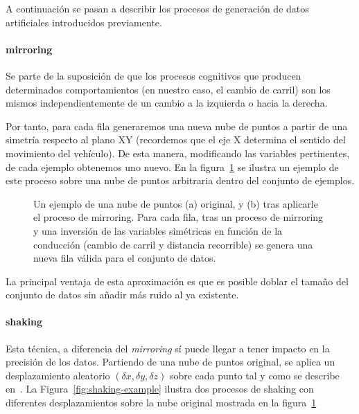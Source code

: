 A continuación se pasan a describir los procesos de generación de datos artificiales introducidos previamente.

\paragraph{mirroring}

Se parte de la suposición de que los procesos cognitivos que producen determinados comportamientos (en nuestro caso, el cambio de carril) son los mismos independientemente de un cambio a la izquierda o hacia la derecha.

Por tanto, para cada fila generaremos una nueva nube de puntos a partir de una simetría respecto al plano XY (recordemos que el eje X determina el sentido del movimiento del vehículo). De esta manera, modificando las variables pertinentes, de cada ejemplo obtenemos uno nuevo. En la figura~\ref{fig:mirroring-example} se ilustra un ejemplo de este proceso sobre una nube de puntos arbitraria dentro del conjunto de ejemplos.

\begin{figure}
	\centering
	\qquad
	\caption[Ejemplo de la técnica de \textit{mirroring}]{Un ejemplo de una nube de puntos (a) original, y (b) tras aplicarle el proceso de mirroring. Para cada fila, tras un proceso de mirroring y una inversión de las variables simétricas en función de la conducción (cambio de carril y distancia recorrible) se genera una nueva fila válida para el conjunto de datos.}
	\label{fig:mirroring-example}
\end{figure}

La principal ventaja de esta aproximación es que es posible doblar el tamaño del conjunto de datos sin añadir más ruido al ya existente.

\paragraph{shaking}

Esta técnica, a diferencia del \textit{mirroring} sí puede llegar a tener impacto en la precisión de los datos. Partiendo de una nube de puntos original, se aplica un desplazamiento aleatorio $(\delta x, \delta y, \delta z)$ sobre cada punto tal y como se describe en~\cite{diaz2018modelling}. La Figura~\ref{fig:shaking-example} ilustra dos procesos de shaking con diferentes desplazamientos sobre la nube original mostrada en la figura~\ref{fig:mirroring-example}

